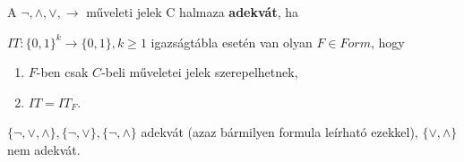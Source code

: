 \documentclass[10pt]{article}
\renewcommand{\\}{\par\noindent}
\begin{document}
\begin{frame}

\begin{tcolorbox}[title={Def: Adekvát halmaz}]
A ${\neg}, {\land}, {\lor}, \rightarrow$ műveleti jelek C halmaza \textbf{adekvát}, ha\\
$IT: \{0, 1\}^k \rightarrow \{0, 1\}, k \geq 1$ igazságtábla esetén van olyan $F \in Form$, hogy\\
\begin{enumerate}
\item $F$-ben csak $C$-beli műveletei jelek szerepelhetnek,
\item $IT = IT_F$.
\end{enumerate} 
\end{tcolorbox}
\bigskip

\begin{tcolorbox}[title={Tétel: Adekvát halmazok}]
$\{\neg, \lor, \land\}, \{\neg, \lor\}, \{\neg, \land\}$ adekvát (azaz bármilyen formula leírható ezekkel), $\{\lor, \land\}$ nem adekvát.
\end{tcolorbox}

\end{frame}
\end{document}

